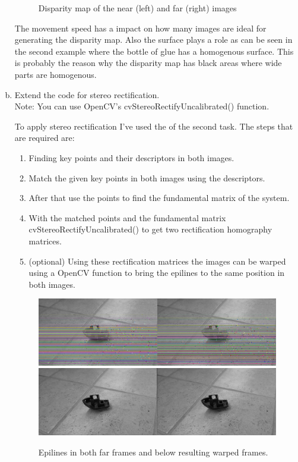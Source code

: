 \documentclass[UTF-8]{article}
\begin{document}
\begin{enumerate}[a.]
\begin{figure}[H]
			\caption{Disparity map of the near (left) and far (right) images}
			\label{fig:disparityglue}
		\end{figure}
		
		The movement speed has a impact on how many images are ideal for generating the disparity map. Also the surface plays a role as can be seen in the second example where the bottle of glue has a homogenous surface. This is probably the reason why the disparity map has black areas where wide parts are homogenous.
		
		\item Extend the code for stereo rectification.\\
		Note: You can use OpenCV’s cvStereoRectifyUncalibrated() function.
		
		To apply stereo rectification I've used the of the second task.
		The steps that are required are:
		\begin{enumerate}[1.]
			\item Finding key points and their descriptors in both images.
			\item Match the given key points in both images using the descriptors.
			\item After that use the points to find the fundamental matrix of the system.
			\item With the matched points and the fundamental matrix cvStereoRectifyUncalibrated() to get two rectification homography matrices.
			\item (optional) Using these rectification matrices the images can be warped using a OpenCV function to bring the epilines to the same position in both images.
		\end{enumerate}
		\begin{figure}[H]
			\centering
			\includegraphics[width=0.7\linewidth]{images/exercise1/videoepilines11skips}
			\includegraphics[width=0.7\linewidth]{images/exercise1/videowarped11skips}
			\caption{Epilines in both far frames and below resulting warped frames.}
			\label{fig:videowarped11skips}
		\end{figure}
		

\end{enumerate}
\end{document}
